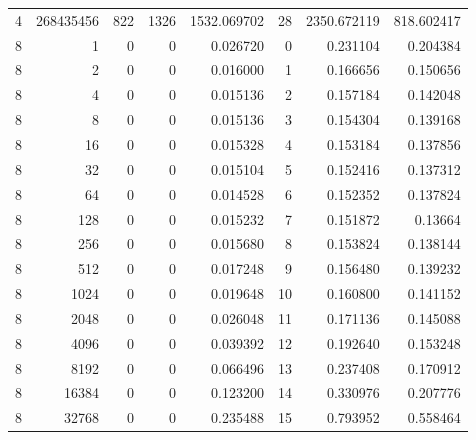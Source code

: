 \begin{longtable}[c]{@{}rrrrrrrr@{}}
    4         & 268435456 & 822       & 1326     & 1532.069702 & 28                  & 2350.672119 & 818.602417 \\
    8         & 1         & 0         & 0        & 0.026720    & 0                   & 0.231104    & 0.204384   \\
    8         & 2         & 0         & 0        & 0.016000    & 1                   & 0.166656    & 0.150656   \\
    8         & 4         & 0         & 0        & 0.015136    & 2                   & 0.157184    & 0.142048   \\
    8         & 8         & 0         & 0        & 0.015136    & 3                   & 0.154304    & 0.139168   \\
    8         & 16        & 0         & 0        & 0.015328    & 4                   & 0.153184    & 0.137856   \\
    8         & 32        & 0         & 0        & 0.015104    & 5                   & 0.152416    & 0.137312   \\
    8         & 64        & 0         & 0        & 0.014528    & 6                   & 0.152352    & 0.137824   \\
    8         & 128       & 0         & 0        & 0.015232    & 7                   & 0.151872    & 0.13664    \\
    8         & 256       & 0         & 0        & 0.015680    & 8                   & 0.153824    & 0.138144   \\
    8         & 512       & 0         & 0        & 0.017248    & 9                   & 0.156480    & 0.139232   \\
    8         & 1024      & 0         & 0        & 0.019648    & 10                  & 0.160800    & 0.141152   \\
    8         & 2048      & 0         & 0        & 0.026048    & 11                  & 0.171136    & 0.145088   \\
    8         & 4096      & 0         & 0        & 0.039392    & 12                  & 0.192640    & 0.153248   \\
    8         & 8192      & 0         & 0        & 0.066496    & 13                  & 0.237408    & 0.170912   \\
    8         & 16384     & 0         & 0        & 0.123200    & 14                  & 0.330976    & 0.207776   \\
    8         & 32768     & 0         & 0        & 0.235488    & 15                  & 0.793952    & 0.558464   \\

\end{longtable}
